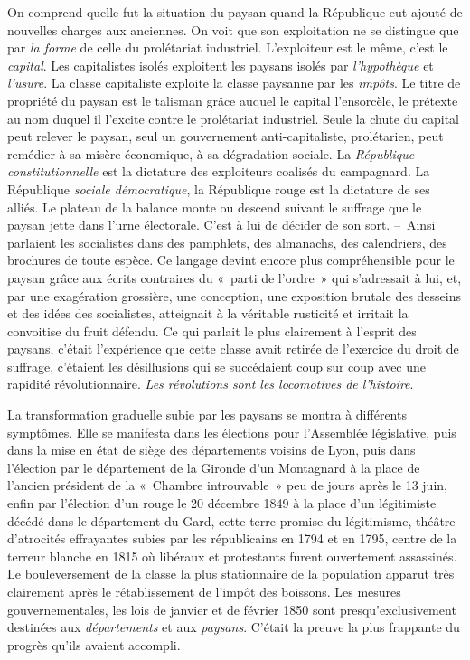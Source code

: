 \documentclass[twoside]{book} %
\begin{document}
On comprend quelle fut la situation du paysan quand la République eut ajouté de nouvelles charges aux anciennes. On voit que son exploitation ne se distingue que par \emph{la forme} de celle du prolétariat industriel. L’exploiteur est le même, c’est le \emph{capital}. Les capitalistes isolés exploitent les paysans isolés par \emph{l’hypothèque} et \emph{l’usure}. La classe capitaliste exploite la classe paysanne par les \emph{impôts}. Le titre de propriété du paysan est le talisman grâce auquel le capital l’ensorcèle, le prétexte au nom duquel il l’excite contre le prolétariat industriel. Seule la chute du capital peut relever le paysan, seul un gouvernement anti-capitaliste, prolétarien, peut remédier à sa misère économique, à sa dégradation sociale. La \emph{République constitutionnelle} est la dictature des exploiteurs coalisés du campagnard. La République \emph{sociale démocratique}, la République rouge est la dictature de ses alliés. Le plateau de la balance monte ou descend suivant le suffrage que le paysan jette dans l’urne électorale. C’est à lui de décider de son sort. – Ainsi parlaient les socialistes dans des pamphlets, des almanachs, des calendriers, des brochures de toute espèce. Ce langage devint encore plus compréhensible pour le paysan grâce aux écrits contraires du « parti de l’ordre » qui s’adressait à lui, et, par une exagération grossière, une conception, une exposition brutale des desseins et des idées des socialistes, atteignait à la véritable rusticité et irritait la convoitise du fruit défendu. Ce qui parlait le plus clairement à l’esprit des paysans, c’était l’expérience que cette classe avait retirée de l’exercice du droit de suffrage, c’étaient les désillusions qui se succédaient coup sur coup avec une rapidité révolutionnaire. \emph{Les révolutions sont les locomotives de l’histoire}.\par
La transformation graduelle subie par les paysans se montra à différents symptômes. Elle se manifesta dans les élections pour l’Assemblée législative, puis dans la mise en état de siège des départements voisins de Lyon, puis dans l’élection par le département de la Gironde d’un Montagnard à la place de l’ancien président de la « Chambre introuvable » peu de jours après le 13 juin, enfin par l’élection d’un rouge le 20 décembre 1849 à la place d’un légitimiste décédé dans le département du Gard, cette terre promise du légitimisme, théâtre d’atrocités effrayantes subies par les républicains en 1794 et en 1795, centre de la terreur blanche en 1815 où libéraux et protestants furent ouvertement assassinés. Le bouleversement de la classe la plus stationnaire de la population apparut très clairement après le rétablissement de l’impôt des boissons. Les mesures gouvernementales, les lois de janvier et de février 1850 sont presqu’exclusivement destinées aux \emph{départements} et aux \emph{paysans}. C’était la preuve la plus frappante du progrès qu’ils avaient accompli.\par
\end{document}

